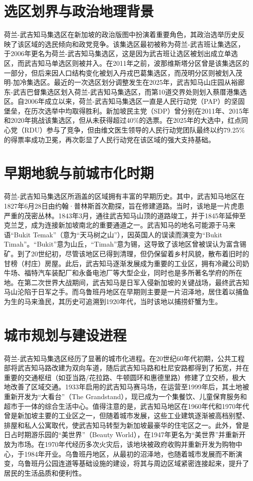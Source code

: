 \documentclass[11pt,a4paper,twoside,openany]{book}
\begin{document}
\section{选区划界与政治地理背景}
荷兰-武吉知马集选区在新加坡的政治版图中扮演着重要角色，其政治选举历史反映了该区域的选民倾向和政党竞争。该集选区最初被称为荷兰-武吉班让集选区，于2006年更名为荷兰-武吉知马集选区，这是因为武吉班让选区被划出成立单选区，而武吉知马单选区则被并入。在2011年之前，波那维斯塔分区曾是该集选区的一部分，但后来因人口结构变化被划入丹戎巴葛集选区，而茂明分区则被划入茂明-加冷集选区。最近的一次选区划分调整发生在2025年，武吉知马山庄园从裕廊东-武吉巴督集选区划入荷兰-武吉知马集选区，而第10道交界处则划入蔡厝港集选区。自2006年成立以来，荷兰-武吉知马集选区一直是人民行动党（PAP）的坚固堡垒，在历次选举中均取得胜利。新加坡民主党（SDP）曾分别在2011年、2015年和2020年挑战该集选区，但从未获得超过40\%的选票。在2025年的大选中，红点同心党（RDU）参与了竞争，但由维文医生领导的人民行动党团队最终以约79.25\%的得票率成功卫冕，再次彰显了人民行动党在该区域的强大支持基础。

\section{早期地貌与前城市化时期}
荷兰-武吉知马集选区所涵盖的区域拥有丰富的早期历史。其中，武吉知马地区在1827年6月28日由约翰·普林斯首次勘探，旨在修建道路。当时，该地是一片虎患严重的茂密丛林。1843年3月，通往武吉知马山顶的道路竣工，并于1845年延伸至克兰芝，成为连接新加坡南北的重要通道之一。武吉知马的地名可能源于马来语“Bukit Temak”（意为“天马树之山”），因英国人的误读而演变为“Bukit Timah”。“Bukit”意为山丘，“Timah”意为锡，这导致了该地区曾被误认为富含锡矿。到了20世纪初，尽管该地区已得到清理，但仍保留着乡村风貌，散布着旧时的甘榜（村庄）房屋。此后，武吉知马逐渐发展成为重要的工业区，拥有冷藏公司奶牛场、福特汽车装配厂和永备电池厂等大型企业，同时也是多所著名学府的所在地。在第二次世界大战期间，武吉知马是日军入侵新加坡的关键战场，最终武吉知马山沦陷于日军之手。而乌鲁班丹地区在早期则主要是一片沼泽地，居住着以捕鱼为生的马来渔民，其历史可追溯到1920年代，当时该地以捕捞虾蟹为生。

\section{城市规划与建设进程}
荷兰-武吉知马集选区经历了显著的城市化进程。在20世纪60年代初期，公共工程部将武吉知马路改建为双向车道，随后武吉知马路和杜尼安路都得到了拓宽，并在重要的交通枢纽（如亚当路/花拉路、牛顿圆环和惠德里路）修建了立交桥，极大地改善了区域交通。1933年启用的武吉知马赛马场，在运营至1999年后，其土地被重新开发为“大看台”（The Grandstand），现已成为一个集餐饮、儿童保育服务和超市于一体的综合生活中心。值得注意的是，武吉知马地区在1960年代和1970年代曾是新加坡主要的工业区之一，但随着城市发展，这些工业建筑逐渐被高档别墅、排屋和私人公寓取代，使武吉知马转型为新加坡最豪华的住宅区之一。此外，曾是日占时期游乐园的“美世界”（Beauty World），在1947年更名为“美世界”并重新开放为市场。在1970年代经历多次火灾后，该地块被政府收购并重新开发为购物中心，于1984年开业。乌鲁班丹地区，从最初的沼泽地，也随着城市发展而不断演变，乌鲁班丹公园连道等基础设施的建设，将其与周边区域紧密连接起来，提升了居民的生活品质和便利性。
\end{document}
